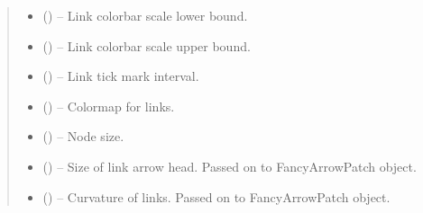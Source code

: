 \documentclass[letterpaper,10pt,english]{sphinxmanual}
\begin{document}
\begin{fulllineitems}
\begin{quote}
\begin{description}
\begin{itemize}
\item {} 
 (\sphinxstyleliteralemphasis{, }\sphinxstyleliteralemphasis{ (}\sphinxstyleliteralemphasis{)}\sphinxstyleliteralemphasis{}) -- Link colorbar scale lower bound.

\item {} 
 (\sphinxstyleliteralemphasis{, }\sphinxstyleliteralemphasis{ (}\sphinxstyleliteralemphasis{)}\sphinxstyleliteralemphasis{}) -- Link colorbar scale upper bound.

\item {} 
 (\sphinxstyleliteralemphasis{, }\sphinxstyleliteralemphasis{ (}\sphinxstyleliteralemphasis{)}\sphinxstyleliteralemphasis{}) -- Link tick mark interval.

\item {} 
 (\sphinxstyleliteralemphasis{, }\sphinxstyleliteralemphasis{ (}\sphinxstyleliteralemphasis{)}\sphinxstyleliteralemphasis{}) -- Colormap for links.

\item {} 
 (\sphinxstyleliteralemphasis{, }\sphinxstyleliteralemphasis{ (}\sphinxstyleliteralemphasis{)}\sphinxstyleliteralemphasis{}) -- Node size.

\item {} 
 (\sphinxstyleliteralemphasis{, }\sphinxstyleliteralemphasis{ (}\sphinxstyleliteralemphasis{)}\sphinxstyleliteralemphasis{}) -- Size of link arrow head. Passed on to FancyArrowPatch object.

\item {} 
\sphinxstyleliteralstrong{, }\sphinxstyleliteralstrong{ (} (\sphinxstyleliteralemphasis{,}\sphinxstyleliteralemphasis{}) -- Curvature of links. Passed on to FancyArrowPatch object.


\end{itemize}
\end{description}
\end{quote}
\end{fulllineitems}
\end{document}
